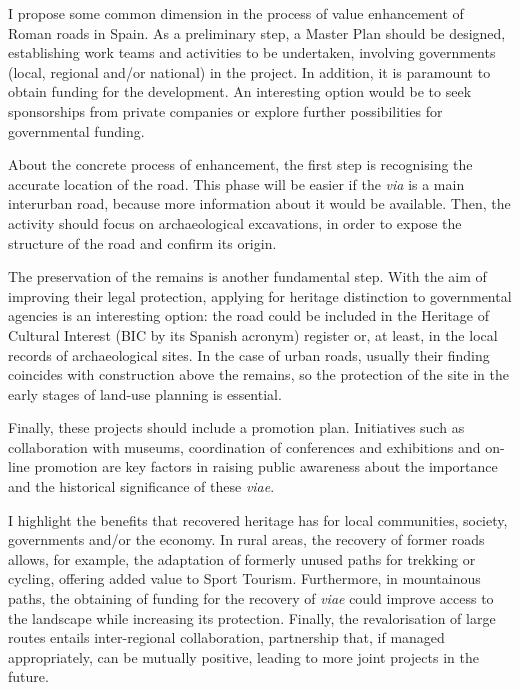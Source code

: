 I propose some common dimension in the process of value enhancement of Roman roads in Spain. As a preliminary step, a Master Plan should be designed, establishing work teams and activities to be undertaken, involving governments (local, regional and/or national) in the project. In addition, it is paramount to obtain funding for the development. An interesting option would be to seek sponsorships from private companies or explore further possibilities for governmental funding.

About the concrete process of enhancement, the first step is recognising the accurate location of the road. This phase will be easier if the \textit{via} is a main interurban road, because more information about it would be available. Then, the activity should focus on archaeological excavations, in order to expose the structure of the road and confirm its origin.

The preservation of the remains is another fundamental step. With the aim of improving their legal protection, applying for heritage distinction to governmental agencies is an interesting option: the road could be included in the Heritage of Cultural Interest (BIC by its Spanish acronym) register or, at least, in the local records of archaeological sites. In the case of urban roads, usually their finding coincides with construction above the remains, so the protection of the site in the early stages of land-use planning is essential.

Finally, these projects should include a promotion plan. Initiatives such as collaboration with museums, coordination of conferences and exhibitions and on-line promotion are key factors in raising public awareness about the importance and the historical significance of these \textit{viae}.


I  highlight the benefits that recovered heritage has for local communities, society, governments and/or the economy. In rural areas, the recovery of former roads allows, for example, the adaptation of formerly unused paths for trekking or cycling, offering added value to Sport Tourism. Furthermore, in mountainous paths, the obtaining of funding for the recovery of \textit{viae} could improve access to the landscape while increasing its protection. Finally, the revalorisation of large routes entails inter-regional collaboration, partnership that, if managed appropriately, can be mutually positive, leading to more joint projects in the future. 


